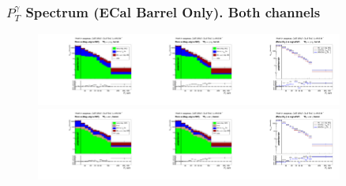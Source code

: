 \begin{frame}\frametitle{\footnotesize{$P_T^{\gamma}$ Spectrum (ECal Barrel Only). Both channels}}
   \begin{figure}[htb]
    \begin{center}
       \includegraphics[width=0.30\textwidth]{../figs/figs_v11/MUON_WGamma/PrepareYields/c_DATAvsBkgPlusSigMCc_MUON_WGamma_TEMPL_CHISO_UNblind__Barrel__phoEt.pdf}\includegraphics[width=0.30\textwidth]{../figs/figs_v11/MUON_WGamma/PrepareYields/c_DATAvsBkgPlusSigMCc_MUON_WGamma_TEMPL_SIHIH_UNblind__Barrel__phoEt.pdf}\includegraphics[width=0.30\textwidth]{../figs/figs_v11/MUON_WGamma/PrepareYields/c_BkgSubtrDATAvsSIGMC_c_MUON_WGamma__UNblind__Barrel__phoEt.pdf}\\
       \includegraphics[width=0.30\textwidth]{../figs/figs_v11/ELECTRON_WGamma/PrepareYields/c_DATAvsBkgPlusSigMCc_ELECTRON_WGamma_TEMPL_CHISO_UNblind__Barrel__phoEt.pdf}\includegraphics[width=0.30\textwidth]{../figs/figs_v11/ELECTRON_WGamma/PrepareYields/c_DATAvsBkgPlusSigMCc_ELECTRON_WGamma_TEMPL_SIHIH_UNblind__Barrel__phoEt.pdf}\includegraphics[width=0.30\textwidth]{../figs/figs_v11/ELECTRON_WGamma/PrepareYields/c_BkgSubtrDATAvsSIGMC_c_ELECTRON_WGamma__UNblind__Barrel__phoEt.pdf}\\

\end{center}
\end{figure}
\end{frame}
